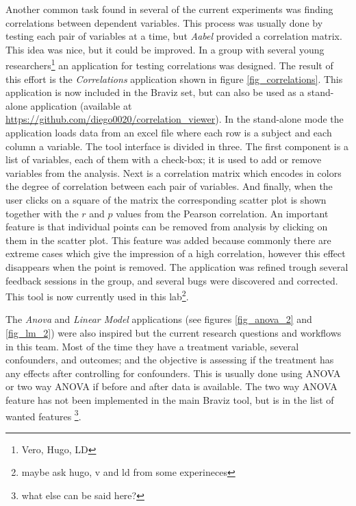 Another common task found in several of the current experiments was finding correlations between dependent variables. This process was usually done by testing each pair of variables at a time, but \emph{Aabel} provided a correlation matrix. This idea was nice, but it could be improved. In a group with several young researchers\footnote{Vero, Hugo, LD} an application for testing correlations was designed. The result of this effort is the \emph{Correlations} application shown in figure \ref{fig_correlations}. This application is now included in the Braviz set, but can also be used as a stand-alone application (available at \url{https://github.com/diego0020/correlation_viewer}). In the stand-alone mode the application loads data from an excel file where each row is a subject and each column a variable. The tool interface is divided in three. The first component is a list of variables, each of them with a check-box; it is used to add or remove variables from the analysis. Next is a correlation matrix which encodes in colors the degree of correlation between each pair of variables. And finally, when the user clicks on a square of the matrix the corresponding scatter plot is shown together with the $r$ and $p$ values from the Pearson correlation. An important feature is that individual points can be removed from analysis by clicking on them in the scatter plot. This feature was added because commonly there are extreme cases which give the impression of a high correlation, however this effect disappears when the point is removed. The application was refined trough several feedback sessions in the group, and several bugs were discovered and corrected.  This tool is now currently used in this lab\footnote{maybe ask hugo, v and ld from some experineces}.

The \emph{Anova} and \emph{Linear Model} applications (see figures \ref{fig_anova_2} and \ref{fig_lm_2}) were also inspired but the current research questions and workflows in this team. Most of the time they have a treatment variable, several confounders, and outcomes; and the objective is assessing if the treatment has any effects after controlling for confounders. This is usually done using ANOVA or two way ANOVA if before and after data is available. The two way ANOVA feature has not been implemented in the main Braviz tool, but is in the list of wanted features \footnote{what else can be said here?}. 

% 


